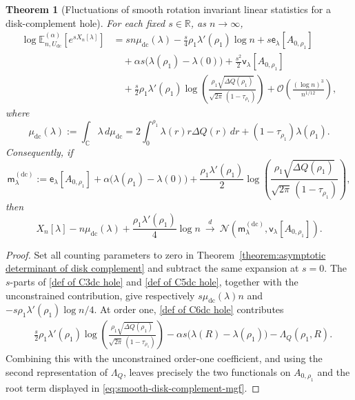 \documentclass[a4paper]{article}
\newtheorem{theorem}{Theorem}[section]
\newcommand{\C}{\mathbb{C}}
\newcommand{\R}{\mathbb{R}}
\numberwithin{equation}{section}
\begin{document}
\begin{theorem}[Fluctuations of smooth rotation invariant linear statistics for a disk-complement hole]
\label{theorem:smooth-disk-complement}
For each fixed $s\in\R$, as $n\to\infty$,
\begin{align}
\log \mathbb E_{n,U_{\mathrm{dc}}}^{(\alpha)}
 \!\left[e^{sX_n[\lambda]}\right]
&=sn\mu_{\mathrm{dc}}(\lambda)
-\frac{s}{4}\rho_1\lambda'(\rho_1)\log n
+s\mathsf e_\lambda[A_{0,\rho_1}]
\nonumber\\
&\quad
+\alpha s\bigl(\lambda(\rho_1)-\lambda(0)\bigr)
+\frac{s^2}{2}\mathsf v_\lambda[A_{0,\rho_1}]
\nonumber\\
&\quad
+\frac{s}{2}\rho_1\lambda'(\rho_1)
 \log\!\left(
 \frac{\rho_1\sqrt{\Delta Q(\rho_1)}}
 {\sqrt{2\pi}\,(1-\tau_{\rho_1})}
 \right)
+\mathcal O\!\left(\frac{(\log n)^3}{n^{1/12}}\right),
\label{eq:smooth-disk-complement-mgf}
\end{align}
where
\begin{equation}
\label{def:mu-disk-complement-smooth}
\mu_{\mathrm{dc}}(\lambda)
:=\int_{\C}\lambda\,d\mu_{\mathrm{dc}}
=2\int_0^{\rho_1}\lambda(r)r\Delta Q(r)\,dr
+(1-\tau_{\rho_1})\lambda(\rho_1).
\end{equation}
Consequently, if
\begin{equation}
\label{def:m-disk-complement-smooth}
\mathsf m_\lambda^{(\mathrm{dc})}
:=\mathsf e_\lambda[A_{0,\rho_1}]
+\alpha\bigl(\lambda(\rho_1)-\lambda(0)\bigr)
+\frac{\rho_1\lambda'(\rho_1)}{2}
 \log\!\left(
 \frac{\rho_1\sqrt{\Delta Q(\rho_1)}}
 {\sqrt{2\pi}\,(1-\tau_{\rho_1})}
 \right),
\end{equation}
then
\begin{equation}
\label{eq:smooth-disk-complement-clt}
X_n[\lambda]-n\mu_{\mathrm{dc}}(\lambda)
+\frac{\rho_1\lambda'(\rho_1)}4\log n
\ \xrightarrow{\ d\ }\
\mathcal N\!\left(
\mathsf m_\lambda^{(\mathrm{dc})},
\mathsf v_\lambda[A_{0,\rho_1}]
\right).
\end{equation}
\end{theorem}

\begin{proof}
Set all counting parameters to zero in
Theorem~\ref{theorem:asymptotic determinant of disk complement} and subtract
the same expansion at $s=0$.  The $s$-parts of
\eqref{def of C3dc hole} and \eqref{def of C5dc hole}, together with the
unconstrained contribution, give respectively
$s\mu_{\mathrm{dc}}(\lambda)n$ and
$-s\rho_1\lambda'(\rho_1)\log n/4$.  At order one,
\eqref{def of C6dc hole} contributes
\begin{align*}
&\frac{s}{2}\rho_1\lambda'(\rho_1)
 \log\!\left(
 \frac{\rho_1\sqrt{\Delta Q(\rho_1)}}
 {\sqrt{2\pi}\,(1-\tau_{\rho_1})}
 \right)
-\alpha s\bigl(\lambda(R)-\lambda(\rho_1)\bigr)
-\Lambda_Q(\rho_1,R).
\end{align*}
Combining this with the unconstrained order-one coefficient, and using the
second representation of $\Lambda_Q$, leaves precisely the two functionals
on $A_{0,\rho_1}$ and the root term displayed in
\eqref{eq:smooth-disk-complement-mgf}.
\end{proof}
\end{document}
